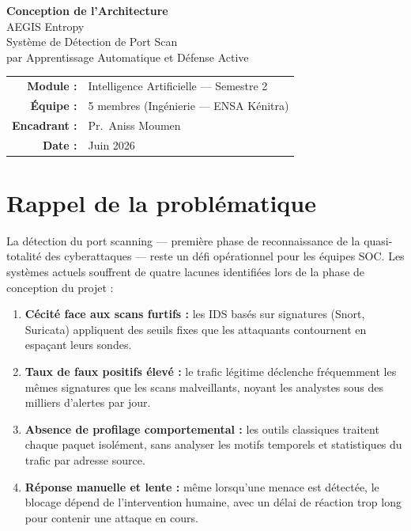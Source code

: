 \documentclass[12pt,a4paper]{article}
\begin{document}
\begin{center}
  {\Large\bfseries Conception de l'Architecture}\\[0.6em]
  {\large AEGIS Entropy}\\[0.3em]
  {\large Syst\`{e}me de D\'{e}tection de Port Scan\\[0.2em]
   par Apprentissage Automatique et D\'{e}fense Active}\\[1.2em]
  \begin{tabular}{rl}
    \textbf{Module :}  & Intelligence Artificielle --- Semestre 2 \\
    \textbf{\'{E}quipe :} & 5 membres (Ing\'{e}nierie --- ENSA K\'{e}nitra) \\
    \textbf{Encadrant :}  & Pr.\ Aniss Moumen \\
    \textbf{Date :}    & Juin 2026 \\
  \end{tabular}
\end{center}

\vspace{1em}

\section{Rappel de la probl\'{e}matique}

La d\'{e}tection du port scanning --- premi\`{e}re phase de reconnaissance de
la quasi-totalit\'{e} des cyberattaques --- reste un d\'{e}fi op\'{e}rationnel
pour les \'{e}quipes SOC. Les syst\`{e}mes actuels souffrent de quatre lacunes
identifi\'{e}es lors de la phase de conception du projet :

\begin{enumerate}[nosep,leftmargin=1.5em]
  \item \textbf{C\'{e}cit\'{e} face aux scans furtifs :}
        les IDS bas\'{e}s sur signatures (Snort, Suricata) appliquent des seuils
        fixes que les attaquants contournent en espa\c{c}ant leurs sondes.
  \item \textbf{Taux de faux positifs \'{e}lev\'{e} :}
        le trafic l\'{e}gitime d\'{e}clenche fr\'{e}quemment les m\^{e}mes
        signatures que les scans malveillants, noyant les analystes sous des
        milliers d'alertes par jour.
  \item \textbf{Absence de profilage comportemental :}
        les outils classiques traitent chaque paquet isol\'{e}ment, sans analyser
        les motifs temporels et statistiques du trafic par adresse source.
  \item \textbf{R\'{e}ponse manuelle et lente :}
        m\^{e}me lorsqu'une menace est d\'{e}tect\'{e}e, le blocage d\'{e}pend
        de l'intervention humaine, avec un d\'{e}lai de r\'{e}action trop long
        pour contenir une attaque en cours.
\end{enumerate}
\end{document}
